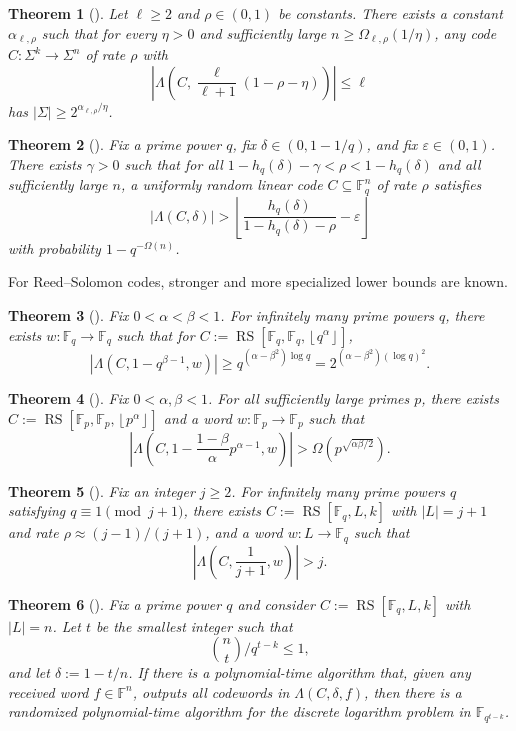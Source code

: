 \documentclass[11pt]{article}
\theoremstyle{plain}
\newtheorem{theorem}{Theorem}[section]
\theoremstyle{definition}
\newcommand{\F}{\mathbb{F}}
\newcommand{\RS}[3]{\operatorname{RS}[#1,#2,#3]}
\newcommand{\floor}[1]{\left\lfloor #1\right\rfloor}
\newcommand{\abs}[1]{\left|#1\right|}
\begin{document}
\begin{theorem}[\cite{BDG24,AGL23}]
Let $\ell\ge2$ and $\rho\in(0,1)$ be constants. There exists a constant $\alpha_{\ell,\rho}$ such that for every $\eta>0$ and sufficiently large $n\ge\Omega_{\ell,\rho}(1/\eta)$, any code $C:\Sigma^k\to\Sigma^n$ of rate $\rho$ with
\[
  \left|\Lambda\left(C,\frac{\ell}{\ell+1}(1-\rho-\eta)\right)\right|\le\ell
\]
has $\abs{\Sigma}\ge 2^{\alpha_{\ell,\rho}/\eta}$.
\end{theorem}

\begin{theorem}[\cite{GLMRSW22}]
Fix a prime power $q$, fix $\delta\in(0,1-1/q)$, and fix $\varepsilon\in(0,1)$. There exists $\gamma>0$ such that for all $1-h_q(\delta)-\gamma<\rho<1-h_q(\delta)$ and all sufficiently large $n$, a uniformly random linear code $C\subseteq\F_q^n$ of rate $\rho$ satisfies
\[
  \abs{\Lambda(C,\delta)}>
  \left\lfloor \frac{h_q(\delta)}{1-h_q(\delta)-\rho}-\varepsilon\right\rfloor
\]
with probability $1-q^{-\Omega(n)}$.
\end{theorem}

For Reed--Solomon codes, stronger and more specialized lower bounds are known.

\begin{theorem}[\cite{BKR06}]
Fix $0<\alpha<\beta<1$. For infinitely many prime powers $q$, there exists $w:\F_q\to\F_q$ such that for $C:=\RS{\F_q}{\F_q}{\floor{q^\alpha}}$,
\[
  \abs{\Lambda(C,1-q^{\beta-1},w)}\ge q^{(\alpha-\beta^2)\log q}=2^{(\alpha-\beta^2)(\log q)^2}.
\]
\end{theorem}

\begin{theorem}[\cite{GHSZ02}]
Fix $0<\alpha,\beta<1$. For all sufficiently large primes $p$, there exists $C:=\RS{\F_p}{\F_p}{\floor{p^\alpha}}$ and a word $w:\F_p\to\F_p$ such that
\[
  \left|\Lambda\left(C,1-\frac{1-\beta}{\alpha}p^{\alpha-1},w\right)\right|>
  \Omega\left(p^{\sqrt{\alpha\beta/2}}\right).
\]
\end{theorem}

\begin{theorem}[\cite{JH01}]
Fix an integer $j\ge2$. For infinitely many prime powers $q$ satisfying $q\equiv1\pmod{j+1}$, there exists $C:=\RS{\F_q}{L}{k}$ with $\abs{L}=j+1$ and rate $\rho\approx (j-1)/(j+1)$, and a word $w:L\to\F_q$ such that
\[
  \left|\Lambda\left(C,\frac1{j+1},w\right)\right|>j.
\]
\end{theorem}

\begin{theorem}[\cite{CW07}]
Fix a prime power $q$ and consider $C:=\RS{\F_q}{L}{k}$ with $\abs{L}=n$. Let $t$ be the smallest integer such that
\[
  \binom{n}{t}/q^{t-k}\le1,
\]
and let $\delta:=1-t/n$. If there is a polynomial-time algorithm that, given any received word $f\in\F^n$, outputs all codewords in $\Lambda(C,\delta,f)$, then there is a randomized polynomial-time algorithm for the discrete logarithm problem in $\F_{q^{t-k}}$.
\end{theorem}
\end{document}

